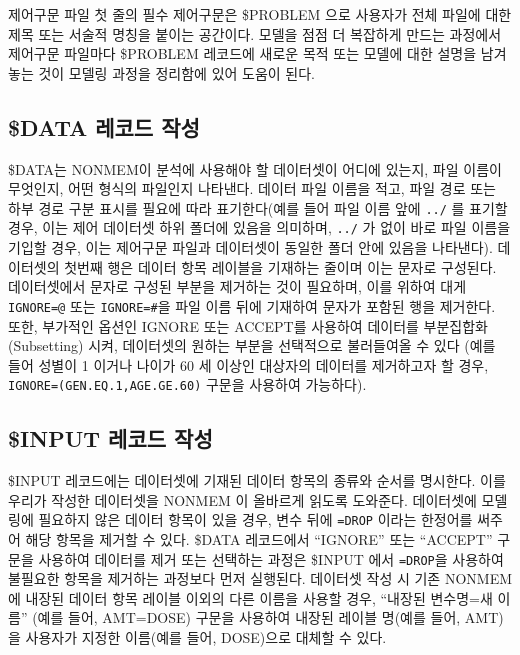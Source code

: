 \documentclass[
  10pt,
  krantz2,
  a4paper]{krantz}
\theoremstyle{definition}
\theoremstyle{definition}
\theoremstyle{definition}
\theoremstyle{remark}
\begin{document}
제어구문 파일 첫 줄의 필수 제어구문은 \$PROBLEM 으로 사용자가 전체 파일에 대한 제목 또는 서술적 명칭을 붙이는 공간이다. 모델을 점점 더 복잡하게 만드는 과정에서 제어구문 파일마다 \$PROBLEM 레코드에 새로운 목적 또는 모델에 대한 설명을 남겨놓는 것이 모델링 과정을 정리함에 있어 도움이 된다.

\hypertarget{data-uxb808uxcf54uxb4dc-uxc791uxc131}{%
\subsection{\$DATA 레코드 작성}\label{data-uxb808uxcf54uxb4dc-uxc791uxc131}}

\$DATA는 NONMEM이 분석에 사용해야 할 데이터셋이 어디에 있는지, 파일 이름이 무엇인지, 어떤 형식의 파일인지 나타낸다. 데이터 파일 이름을 적고, 파일 경로 또는 하부 경로 구분 표시를 필요에 따라 표기한다(예를 들어 파일 이름 앞에 \texttt{../} 를 표기할 경우, 이는 제어 데이터셋 하위 폴더에 있음을 의미하며, \texttt{../} 가 없이 바로 파일 이름을 기입할 경우, 이는 제어구문 파일과 데이터셋이 동일한 폴더 안에 있음을 나타낸다). 데이터셋의 첫번째 행은 데이터 항목 레이블을 기재하는 줄이며 이는 문자로 구성된다. 데이터셋에서 문자로 구성된 부분을 제거하는 것이 필요하며, 이를 위하여 대게 \texttt{IGNORE=@} 또는 \texttt{IGNORE=\#}을 파일 이름 뒤에 기재하여 문자가 포함된 행을 제거한다. 또한, 부가적인 옵션인 IGNORE 또는 ACCEPT를 사용하여 데이터를 부분집합화(Subsetting) 시켜, 데이터셋의 원하는 부분을 선택적으로 불러들여올 수 있다 (예를 들어 성별이 1 이거나 나이가 60 세 이상인 대상자의 데이터를 제거하고자 할 경우, \texttt{IGNORE=(GEN.EQ.1,AGE.GE.60)} 구문을 사용하여 가능하다).

\hypertarget{input-uxb808uxcf54uxb4dc-uxc791uxc131}{%
\subsection{\$INPUT 레코드 작성}\label{input-uxb808uxcf54uxb4dc-uxc791uxc131}}

\$INPUT 레코드에는 데이터셋에 기재된 데이터 항목의 종류와 순서를 명시한다. 이를 우리가 작성한 데이터셋을 NONMEM 이 올바르게 읽도록 도와준다. 데이터셋에 모델링에 필요하지 않은 데이터 항목이 있을 경우, 변수 뒤에 \texttt{=DROP} 이라는 한정어를 써주어 해당 항목을 제거할 수 있다. \$DATA 레코드에서 ``IGNORE'' 또는 ``ACCEPT'' 구문을 사용하여 데이터를 제거 또는 선택하는 과정은 \$INPUT 에서 \texttt{=DROP}을 사용하여 불필요한 항목을 제거하는 과정보다 먼저 실행된다. 데이터셋 작성 시 기존 NONMEM에 내장된 데이터 항목 레이블 이외의 다른 이름을 사용할 경우, ``내장된 변수명=새 이름'' (예를 들어, AMT=DOSE) 구문을 사용하여 내장된 레이블 명(예를 들어, AMT)을 사용자가 지정한 이름(예를 들어, DOSE)으로 대체할 수 있다.
\end{document}
